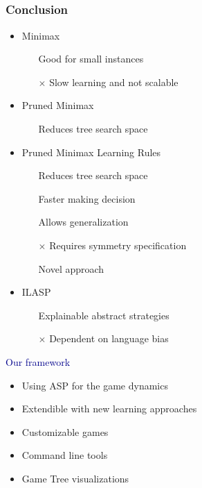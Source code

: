 \documentclass{beamer}
\newcommand\re[1]{\textcolor{darkblue}{#1}}
\begin{document}
\subsection{}
\begin{framefont}{\footnotesize}
  \begin{frame}
    \frametitle{Conclusion}
    \begin{multicols}{2}
    \begin{itemize}[<+->]
      \item Minimax
      \begin{itemize}
        \item[\checkmark] Good for small instances
        \item[$\times$] Slow learning and not scalable
      \end{itemize}
      \item Pruned Minimax
      \begin{itemize}
        \item[\checkmark] Reduces tree search space
      \end{itemize} 
      \item Pruned Minimax Learning Rules
        \begin{itemize}
        \item[\checkmark] Reduces tree search space 
        \item[\checkmark] Faster making decision
        \item[\checkmark] Allows generalization
        \item[$\times$] Requires symmetry specification
        \item[\checkmark] Novel approach
      \end{itemize}
      \item ILASP
      \begin{itemize}
        \item[\checkmark] Explainable abstract strategies
        \item[$\times$] Dependent on language bias
      \end{itemize}
    \end{itemize}
    \columnbreak
    \pause
    \re{Our framework}
    \pause
    \begin{itemize}[<+->]
      \item Using ASP for the game dynamics
      \item Extendible with new learning approaches
      \item Customizable games
      \item Command line tools
      \item Game Tree visualizations
    \end{itemize}
  \end{multicols}
    

  \end{frame}
\end{framefont}
\end{document}
